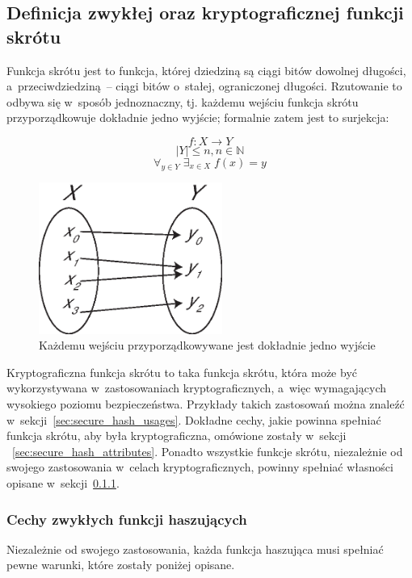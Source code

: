 \documentclass[12pt,a4paper,twoside]{article}
\begin{document}
\subsection{Definicja zwykłej oraz kryptograficznej funkcji skrótu}
Funkcja skrótu jest to funkcja, której dziedziną są ciągi bitów dowolnej
długości, a~przeciwdziedziną~-- ciągi bitów o~stałej, ograniczonej długości.
Rzutowanie to odbywa się w~sposób jednoznaczny, tj. każdemu wejściu funkcja
skrótu przyporządkowuje dokładnie jedno wyjście; formalnie zatem jest to
surjekcja:

$$ f \colon X \to Y $$
$$ |Y| \leq n, n \in \mathbb{N} $$
$$ \forall_{y \in Y} \; \exists_{x \in X} \; f(x)=y $$

\begin{figure}[htb!]
    \includegraphics[width=6cm]{img/surjection.eps}
    \caption{Każdemu wejściu przyporządkowywane jest dokładnie jedno wyjście}
    \label{fig:surjection}
\end{figure}

Kryptograficzna funkcja skrótu to taka funkcja skrótu, która może być
wykorzystywana w~zastosowaniach kryptograficznych, a~więc wymagających
wysokiego poziomu bezpieczeństwa. Przykłady takich zastosowań można znaleźć
w~sekcji~\ref{sec:secure_hash_usages}. Dokładne cechy, jakie powinna spełniać
funkcja skrótu, aby była kryptograficzna, omówione zostały w~sekcji
~\ref{sec:secure_hash_attributes}. Ponadto wszystkie funkcje skrótu,
niezależnie od swojego zastosowania w~celach kryptograficznych, powinny
spełniać własności opisane w~sekcji~\ref{sec:common_hash_attributes}.



\subsubsection{Cechy zwykłych funkcji haszujących}
\label{sec:common_hash_attributes}
Niezależnie od swojego zastosowania, każda funkcja haszująca musi spełniać
pewne warunki, które zostały poniżej opisane.
\end{document}
